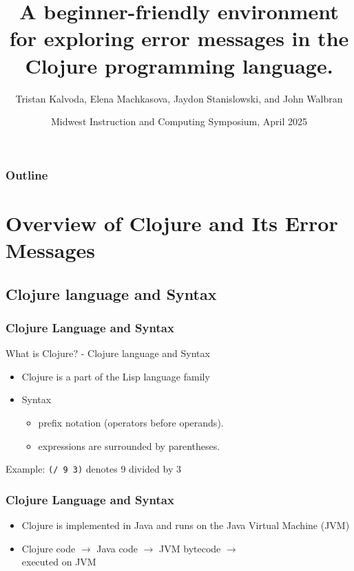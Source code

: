 \documentclass{beamer}
\newcommand{\comment}[1]{{\bf \tt  {#1}}}
\newcommand{\emcomment}[1]{\textcolor{ForestGreen}{\comment{Elena: {#1}}}}
\begin{document}
\title{A beginner-friendly environment for exploring error messages in the Clojure programming language.}
\author{Tristan Kalvoda, Elena Machkasova, Jaydon Stanislowski, and John Walbran}
\date[]  
{Midwest Instruction and Computing Symposium, April 2025}

\begin{frame}
  \titlepage
\end{frame}

\begin{frame}

  \frametitle{Outline}
\tableofcontents
\end{frame}

\section{Overview of Clojure and Its Error Messages}

\subsection{Clojure language and Syntax}
\begin{frame}
\frametitle{Clojure Language and Syntax}
What is Clojure? - Clojure language and Syntax
\begin{itemize}
  \item Clojure is a part of the Lisp language family
  \item Syntax
  \begin{itemize}
    \item prefix notation (operators before operands).
    \item expressions are surrounded by parentheses.
  \end{itemize}
\end{itemize}
Example: \texttt{(/ 9 3)} denotes 9 divided by 3
\end{frame}

\begin{frame}
  \frametitle{Clojure Language and Syntax}
  \begin{itemize}
    \item Clojure is implemented in Java and runs on the Java Virtual Machine (JVM)
    \item Clojure code \(\rightarrow\) Java code \(\rightarrow\) JVM bytecode \(\rightarrow\) \\ executed on JVM
  \end{itemize}
\end{frame}
\end{document}
